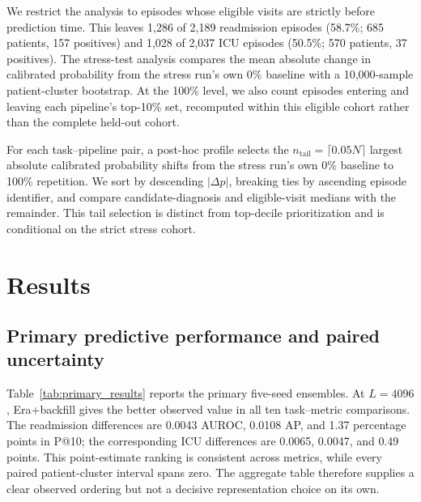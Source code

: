 \documentclass{article}
\newcommand{\topten}{top-10\%}
\begin{document}
We restrict the analysis to episodes whose eligible visits are strictly before
prediction time. This leaves 1,286
of 2,189 readmission episodes (58.7\%; 685 patients, 157 positives) and 1,028
of 2,037 ICU episodes (50.5\%; 570 patients, 37 positives). The stress-test
analysis compares the mean absolute change in calibrated
probability from the stress run's own 0\% baseline with a 10,000-sample
patient-cluster bootstrap. At the 100\% level, we also count episodes entering
and leaving each pipeline's \topten{} set, recomputed within this eligible
cohort rather than the complete held-out cohort.

For each task--pipeline pair, a post-hoc profile selects the
$n_{\mathrm{tail}}=\lceil0.05N\rceil$ largest absolute calibrated probability
shifts from the stress run's own 0\% baseline to 100\% repetition. We sort by
descending $|\Delta p|$, breaking ties by ascending episode identifier, and
compare candidate-diagnosis and eligible-visit medians with the remainder.
This tail selection is distinct from top-decile prioritization and is
conditional on the strict stress cohort.

\section{Results}
\FloatBarrier

\subsection{Primary predictive performance and paired uncertainty}

Table~\ref{tab:primary_results} reports the primary five-seed ensembles.
At $L=4096$, Era+backfill gives the better observed value in all ten
task--metric comparisons. The readmission differences are 0.0043 AUROC,
0.0108 AP, and 1.37 percentage points in P@10; the corresponding ICU
differences are 0.0065, 0.0047, and 0.49 points. This point-estimate ranking is
consistent across metrics, while every paired patient-cluster interval spans
zero. The aggregate table therefore supplies a clear observed ordering but not
a decisive representation choice on its own.
\end{document}

